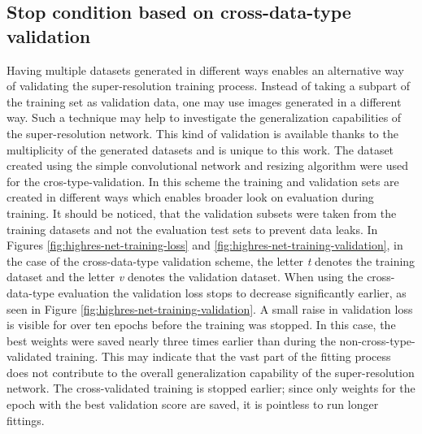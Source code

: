 \subsection{Stop condition based on cross-data-type validation}
\label{sec:cross-type}
Having multiple datasets generated in different ways enables an alternative way of validating the super-resolution training process.
Instead of taking a subpart of the training set as validation data, one may use images generated in a different way.
Such a technique may help to investigate the generalization capabilities of the super-resolution network.
This kind of validation is available thanks to the multiplicity of the generated datasets and is unique to this work.
The dataset created using the simple convolutional network and resizing algorithm were used for the cros-type-validation.
In this scheme the training and validation sets are created in different ways which enables broader look on evaluation during training.
It should be noticed, that the validation subsets were taken from the training datasets and not the evaluation test sets to prevent data leaks.
In Figures \ref{fig:highres-net-training-loss} and \ref{fig:highres-net-training-validation}, in the case of the cross-data-type validation scheme, the letter \textit{t} denotes the training dataset and the letter \textit{v} denotes the validation dataset.
When using the cross-data-type evaluation the validation loss stops to decrease significantly earlier, as seen in Figure \ref{fig:highres-net-training-validation}.
A small raise in validation loss is visible for over ten epochs before the training was stopped.
In this case, the best weights were saved nearly three times earlier than during the non-cross-type-validated training. 
This may indicate that the vast part of the fitting process does not contribute to the overall generalization capability of the super-resolution network.
The cross-validated training is stopped earlier; since only weights for the epoch with the best validation score are saved, it is pointless to run longer fittings.
